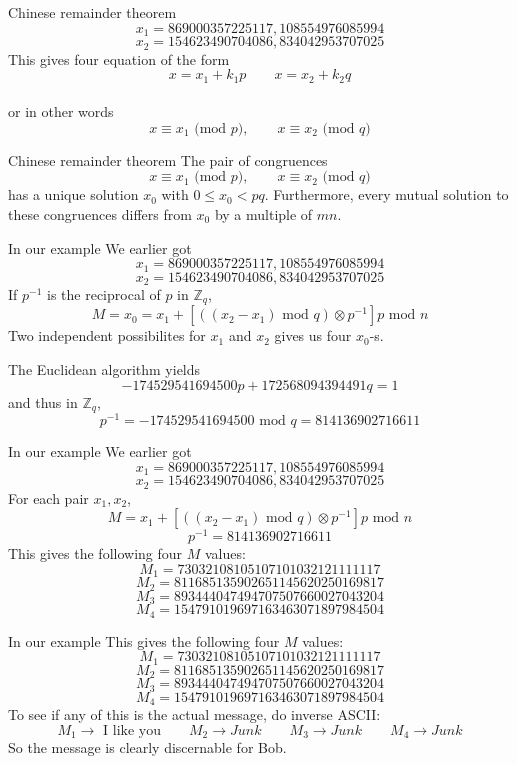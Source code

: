\documentclass{beamer}
\def\bl[#1]#2{\begin{block}{#1}#2\end{block}}
\begin{document}
\begin{frame}{Chinese remainder theorem}\vspace{-0.5cm}
\[
x_1= 869000357225117, 108554976085994
\]
\[
x_2=154623490704086, 834042953707025
\]
This gives four equation of the form
\[
x=x_1+k_1p\qquad x=x_2+k_2q
\]\vspace{-0.6cm}\\
or in other words\vspace{-0.1cm}
\[
x\equiv x_1\textrm{ (mod $p$)},\qquad x\equiv x_2 \textrm{ (mod $q$)}
\]\vspace{-0.5cm}
\bl[Chinese remainder theorem]{
The pair of congruences
\[
x\equiv x_1\textrm{ (mod $p$)},\qquad x\equiv x_2 \textrm{ (mod $q$)}
\]
has a unique solution $x_0$ with $0\leq x_0<pq$. Furthermore, every mutual solution to these congruences differs from $x_0$ by a multiple of $mn$.
}
\end{frame}

\begin{frame}{In our example}
We earlier got
\[
x_1= 869000357225117, 108554976085994
\]
\[
x_2=154623490704086, 834042953707025
\]
If $p^{-1}$ is the reciprocal of $p$ in $\mathbb{Z}_q$,
\[
M=x_0=x_1+\left[((x_2-x_1)\textrm{ mod } q)\otimes p^{-1}\right]p\textrm{ mod }n
\]
Two independent possibilites for $x_1$ and $x_2$ gives us four $x_0$-s.

The Euclidean algorithm yields
\[
-174529541694500p+172568094394491q=1
\]
and thus in $\mathbb{Z}_q$,
\[
p^{-1}=-174529541694500\textrm{ mod }q=814136902716611
\]
\end{frame}

\begin{frame}{In our example}
We earlier got
\[
x_1= 869000357225117, 108554976085994
\]
\[
x_2=154623490704086, 834042953707025
\]
For each pair $x_1,x_2$,
\[
M=x_1+\left[((x_2-x_1)\textrm{ mod } q)\otimes p^{-1}\right]p\textrm{ mod }n
\]
\[
p^{-1}=814136902716611
\]
This gives the following four $M$ values:
\[
M_1=73032108105107101032121111117
\]
\[
M_2=811685135902651145620250169817
\]
\[
M_3=893444047494707507660027043204
\]
\[
M_4=154791019697163463071897984504
\]
\end{frame}

\begin{frame}{In our example}
This gives the following four $M$ values:
\[
M_1=73032108105107101032121111117
\]
\[
M_2=811685135902651145620250169817
\]
\[
M_3=893444047494707507660027043204
\]
\[
M_4=154791019697163463071897984504
\]
To see if any of this is the actual message, do inverse ASCII:
\[
M_1\to \textrm{ I like you}\qquad
M_2\to Junk\qquad
M_3\to Junk\qquad
M_4\to Junk
\]
So the message is clearly discernable for Bob.
\end{frame}
\end{document}
